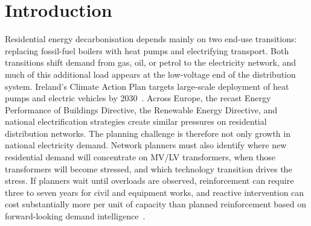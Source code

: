 \documentclass[preprint,12pt]{elsarticle}
\begin{document}

\section{Introduction}
\label{sec:introduction}

Residential energy decarbonisation depends mainly on two end-use
transitions: replacing fossil-fuel boilers with heat pumps and electrifying
transport.
Both transitions shift demand from gas, oil, or petrol to the electricity
network, and much of this additional load appears at the low-voltage end of
the distribution system.
Ireland's Climate Action Plan targets large-scale deployment of heat pumps
and electric vehicles by 2030~\cite{gaur_implications_2022}.
Across Europe, the recast Energy Performance of Buildings Directive, the
Renewable Energy Directive, and national electrification strategies create
similar pressures on residential distribution networks.
The planning challenge is therefore not only growth in national electricity
demand.
Network planners must also identify where new residential demand will
concentrate on MV/LV transformers, when those transformers will become
stressed, and which technology transition drives the stress.
If planners wait until overloads are observed, reinforcement can require
three to seven years for civil and equipment works, and reactive intervention
can cost substantially more per unit of capacity than planned reinforcement
based on forward-looking demand intelligence~\cite{unterluggauer_electric_2022}.
\end{document}
